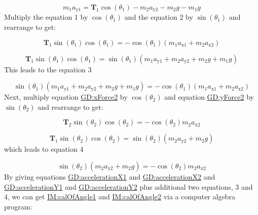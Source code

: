\documentclass[12pt]{article}
\begin{document}
\begin{displaymath}
{m_{1}} {a_{\text{y}1}}={\symbf{T}_{1}} \cos\left({θ_{1}}\right)-{m_{2}} {a_{\text{y}2}}-{m_{2}} g-{m_{1}} g
\end{displaymath}
Multiply the equation 1 by $\cos\left({θ_{1}}\right)$ and the equation 2 by $\sin\left({θ_{1}}\right)$ and rearrange to get:

\begin{displaymath}
{\symbf{T}_{1}} \sin\left({θ_{1}}\right) \cos\left({θ_{1}}\right)=-\cos\left({θ_{1}}\right) \left({m_{1}} {a_{\text{x}1}}+{m_{2}} {a_{\text{x}2}}\right)
\end{displaymath}

\begin{displaymath}
{\symbf{T}_{1}} \sin\left({θ_{1}}\right) \cos\left({θ_{1}}\right)=\sin\left({θ_{1}}\right) \left({m_{1}} {a_{\text{y}1}}+{m_{2}} {a_{\text{y}2}}+{m_{2}} g+{m_{1}} g\right)
\end{displaymath}
This leads to the equation 3

\begin{displaymath}
\sin\left({θ_{1}}\right) \left({m_{1}} {a_{\text{y}1}}+{m_{2}} {a_{\text{y}2}}+{m_{2}} g+{m_{1}} g\right)=-\cos\left({θ_{1}}\right) \left({m_{1}} {a_{\text{x}1}}+{m_{2}} {a_{\text{x}2}}\right)
\end{displaymath}
Next, multiply equation \hyperref[GD:xForce2]{GD:xForce2} by $\cos\left({θ_{2}}\right)$ and equation \hyperref[GD:yForce2]{GD:yForce2} by $\sin\left({θ_{2}}\right)$ and rearrange to get:

\begin{displaymath}
{\symbf{T}_{2}} \sin\left({θ_{2}}\right) \cos\left({θ_{2}}\right)=-\cos\left({θ_{2}}\right) {m_{2}} {a_{\text{x}2}}
\end{displaymath}

\begin{displaymath}
{\symbf{T}_{1}} \sin\left({θ_{2}}\right) \cos\left({θ_{2}}\right)=\sin\left({θ_{2}}\right) \left({m_{2}} {a_{\text{y}2}}+{m_{2}} g\right)
\end{displaymath}
which leads to equation 4

\begin{displaymath}
\sin\left({θ_{2}}\right) \left({m_{2}} {a_{\text{y}2}}+{m_{2}} g\right)=-\cos\left({θ_{2}}\right) {m_{2}} {a_{\text{x}2}}
\end{displaymath}
By giving equations \hyperref[GD:accelerationX1]{GD:accelerationX1} and \hyperref[GD:accelerationX2]{GD:accelerationX2} and \hyperref[GD:accelerationY1]{GD:accelerationY1} and \hyperref[GD:accelerationY2]{GD:accelerationY2} plus additional two equations, 3 and 4, we can get \hyperref[IM:calOfAngle1]{IM:calOfAngle1} and \hyperref[IM:calOfAngle2]{IM:calOfAngle2} via a computer algebra program:
\end{document}
